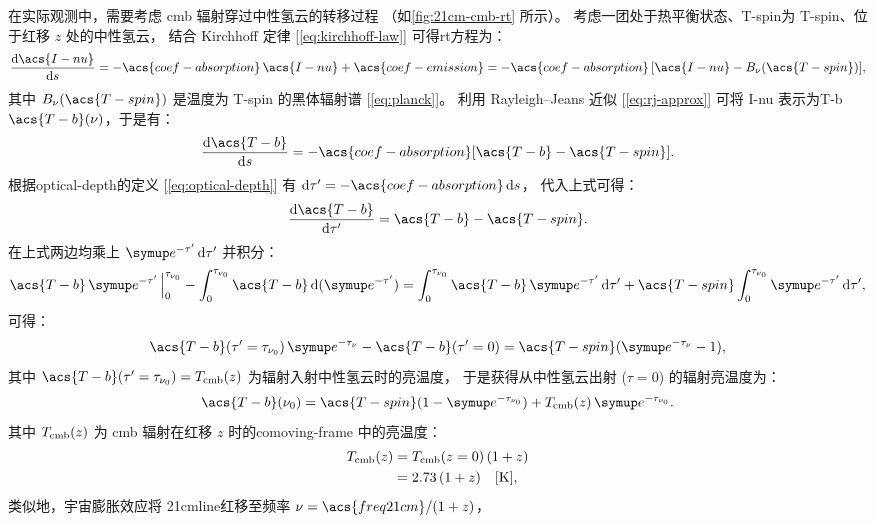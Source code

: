 在实际观测中，需要考虑 \ac{cmb} 辐射穿过中性氢云的转移过程
（如\autoref{fig:21cm-cmb-rt} 所示）。
考虑一团处于热平衡状态、\acl{T-spin}为 \acs{T-spin}、位于红移 $z$ 处的中性氢云，
结合 Kirchhoff 定律 [\autoref{eq:kirchhoff-law}] 可得\ac{rt}方程为：
\begin{equation}
  \diff{\acs{I-nu}}{s}
    = -\acs{coef-absorption}\,\acs{I-nu} + \acs{coef-emission}
    = -\acs{coef-absorption}\,[\acs{I-nu} - B_{\nu}(\acs{T-spin})] ,
\end{equation}
其中
$B_{\nu}(\acs{T-spin})$ 是温度为 \acs{T-spin} 的黑体辐射谱 [\autoref{eq:planck}]。
利用 Rayleigh--Jeans 近似 [\autoref{eq:rj-approx}]
可将 \acs{I-nu} 表示为\acl{T-b} $\acs{T-b}(\nu)$，于是有：
\begin{equation}
  \diff{\acs{T-b}}{s}
    = -\acs{coef-absorption} [\acs{T-b} - \acs{T-spin}] .
\end{equation}
根据\acl{optical-depth}的定义 [\autoref{eq:optical-depth}]
有 $\D{\tau'} = -\acs{coef-absorption}\,\D{s}$，
代入上式可得：
\begin{equation}
  \diff{\acs{T-b}}{\tau'} = \acs{T-b} - \acs{T-spin} .
\end{equation}
在上式两边均乘上 $\Ce^{-\tau'}\,\D{\tau'}$ 并积分：
\begin{equation}
  \acs{T-b}\,\Ce^{-\tau'}\,\Big|_0^{\tau_{\nu_0}}
      - \int_0^{\tau_{\nu_0}} \acs{T-b}\,\D{(\Ce^{-\tau'})}
    = \int_0^{\tau_{\nu_0}} \acs{T-b}\,\Ce^{-\tau'}\,\D{\tau'}
      + \acs{T-spin} \int_0^{\tau_{\nu_0}} \Ce^{-\tau'}\,\D{\tau'} ,
\end{equation}
可得：
\begin{equation}
  \acs{T-b}(\tau'=\tau_{\nu_0})\,\Ce^{-\tau_{\nu}} - \acs{T-b}(\tau'=0)
    = \acs{T-spin} (\Ce^{-\tau_{\nu}} - 1) ,
\end{equation}
其中 $\acs{T-b}(\tau'=\tau_{\nu_0}) = T_{\R{cmb}}(z)$
为辐射入射中性氢云时的亮温度，
于是获得从中性氢云出射 ($\tau = 0$) 的辐射亮温度为：
\begin{equation}
  \acs{T-b}(\nu_0)
    = \acs{T-spin} (1 - \Ce^{-\tau_{\nu_0}})
      + T_{\R{cmb}}(z) \,\Ce^{-\tau_{\nu_0}} .
\end{equation}
其中 $T_{\mathrm{cmb}}(z)$ 为 \ac{cmb} 辐射在红移 $z$ 时的\ac{comoving-frame}
中的亮温度：
\begin{align}
  T_{\mathrm{cmb}}(z)
    & = T_{\mathrm{cmb}}(z=0)\,(1+z)  \\
    & = 2.73 \,(1+z) \quad [\si{\kelvin}] ,
\end{align}
类似地，宇宙膨胀效应将 \ac{21cmline}红移至频率 $\nu = \acs{freq21cm}/(1+z)$，
